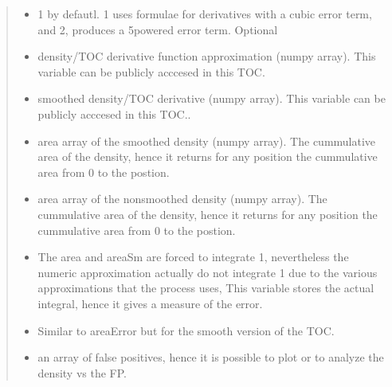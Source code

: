 \documentclass[letterpaper,10pt,english]{sphinxmanual}
\begin{document}
\begin{fulllineitems}
\begin{quote}
\begin{description}
\begin{itemize}
\item {} 
\sphinxAtStartPar
{} \textendash{} 1 by defautl. 1 uses formulae for derivatives with a cubic error term, and 2, produces a 5\sphinxhyphen{}powered error term. Optional

\end{itemize}

\begin{itemize}
\item {} 
\sphinxAtStartPar
{} \textendash{} density/TOC derivative function approximation (numpy array). This variable can be publicly acccesed in this TOC.

\item {} 
\sphinxAtStartPar
{} \textendash{} smoothed density/TOC derivative (numpy array). This variable can be publicly acccesed in this TOC..

\item {} 
\sphinxAtStartPar
{} \textendash{} area array of the smoothed density (numpy array). The cummulative area of the density, hence it returns for any position the cummulative area from 0 to the postion.

\item {} 
\sphinxAtStartPar
{} \textendash{} area array of the non\sphinxhyphen{}smoothed density (numpy array). The cummulative area of the density, hence it returns for any position the cummulative area from 0 to the postion.

\item {} 
\sphinxAtStartPar
{} \textendash{} The area and areaSm are forced to integrate 1, nevertheless the numeric approximation actually do not integrate 1 due to the various approximations that the process uses,
This variable stores the actual integral, hence it gives a measure of the error.

\item {} 
\sphinxAtStartPar
{} \textendash{} Similar to areaError but for the smooth version of the TOC.

\item {} 
\sphinxAtStartPar
{} \textendash{} an array of false positives, hence it is possible to plot or to analyze the density vs the FP.


\end{itemize}
\end{description}
\end{quote}
\end{fulllineitems}
\end{document}
